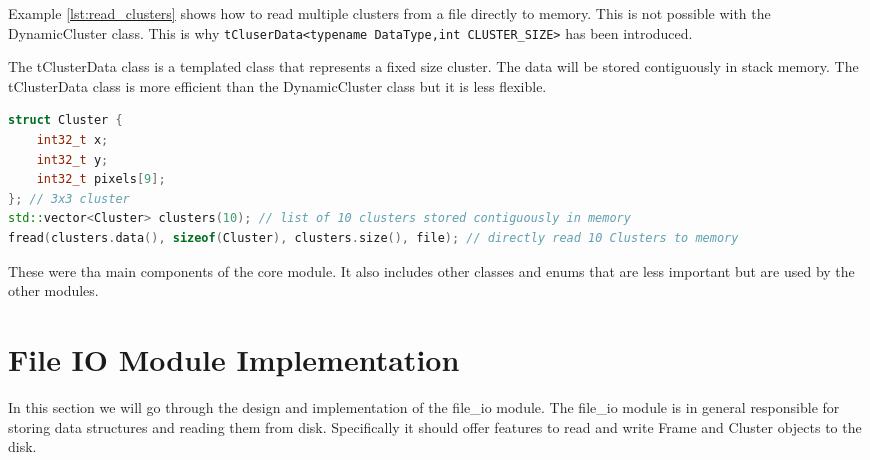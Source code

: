 \begin{spacing}{1.2}
    Example \ref{lst:read_clusters} shows how to read multiple clusters from a file directly to memory. This is not possible
    with the DynamicCluster class. This is why \lstinline|tCluserData<typename DataType,int CLUSTER_SIZE>| has been introduced.

    The tClusterData class is a templated class that represents a fixed size cluster. The data will be stored contiguously in
    stack memory. The tClusterData class is more efficient than the DynamicCluster class but it is less flexible.\\
    \begin{lstlisting}[language=C++, caption={Example: Reading multiple clusters from a file},label={lst:read_clusters}]
struct Cluster {
    int32_t x;
    int32_t y;
    int32_t pixels[9];
}; // 3x3 cluster
std::vector<Cluster> clusters(10); // list of 10 clusters stored contiguously in memory
fread(clusters.data(), sizeof(Cluster), clusters.size(), file); // directly read 10 Clusters to memory
    \end{lstlisting}


    These were tha main components of the core module. It also includes other classes and enums that are less important
    but are used by the other modules.







    \section{File IO Module Implementation}
    In this section we will go through the design and implementation of the file\_io module.
    The file\_io module is in general responsible for storing data structures and reading them from disk.
    Specifically it should offer features to read and write Frame and Cluster objects to the disk.\\


\end{spacing}
